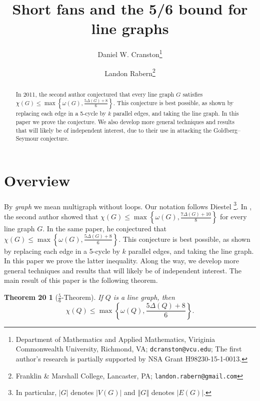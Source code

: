 \documentclass[12pt]{article}
\title{Short fans and the 5/6 bound for line graphs}
\author{Daniel W. Cranston\thanks{Department of Mathematics and Applied
Mathematics, Viriginia Commonwealth University, Richmond, VA;
\texttt{dcranston@vcu.edu}; 
The first author's research is partially supported by NSA Grant
H98230-15-1-0013.}
\and
Landon Rabern\thanks{
Franklin \& Marshall College, Lancaster, PA;
\texttt{landon.rabern@gmail.com}}
}
\theoremstyle{plain}
\newtheorem*{main}{Theorem 20}
\theoremstyle{definition}
\theoremstyle{remark}
\newcommand{\set}[1]{\left\{ #1 \right\}}
\newcommand{\card}[1]{\left|#1\right|}
\newcommand{\size}[1]{\left\Vert#1\right\Vert}
\begin{document}
\maketitle
\begin{abstract}
In 2011, the second author conjectured that every line graph $G$ satisfies
$\chi(G)\le \max\set{\omega(G),\frac{5\Delta(G)+8}{6}}$. This conjecture is best
possible, as shown by replacing each edge in a 5-cycle by $k$ parallel edges,
and taking the line graph. In this paper we prove the conjecture.
We also develop more general techniques and results that will likely be of
independent interest, due to their use in attacking the Goldberg--Seymour
conjecture.  
\end{abstract}

\section{Overview}

By \emph{graph} we mean multigraph without loops.  Our notation follows Diestel
\cite{diestel2010}\footnote{In particular, $\card{G}$ denotes $\card{V(G)}$ and
$\size{G}$ denotes $\card{E(G)}$.}.
In \cite{rabern2011strengthening}, the second author showed that $\chi(G)\le
\max\set{\omega(G), \frac{7\Delta(G)+10}{8}}$ for every line graph $G$.
In the same paper, he conjectured
that $\chi(G)\le \max\set{\omega(G),\frac{5\Delta(G)+8}{6}}$. This conjecture is best
possible, as shown by replacing each edge in a 5-cycle by $k$ parallel edges,
and taking the line graph. In this paper we prove the latter inequality.  Along
the way, we develop more general techniques and results that will likely be of
independent interest.  The main result of this paper is the following theorem.
\begin{main}[$\frac56$-Theorem]
If $Q$ is a line graph, then 
\[\chi(Q)\le \max\set{\omega(Q),\frac{5\Delta(Q)+8}{6}}.\]
\end{main}
\end{document}
